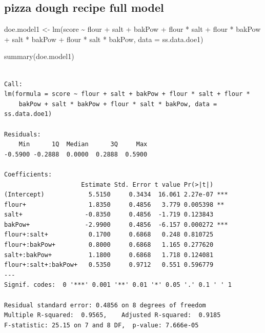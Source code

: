\documentclass[
  a4paper,
]{scrbook}
\newenvironment{Shaded}{\begin{snugshade}}{\end{snugshade}}
\newcommand{\AttributeTok}[1]{\textcolor[rgb]{0.40,0.45,0.13}{#1}}
\newcommand{\FunctionTok}[1]{\textcolor[rgb]{0.28,0.35,0.67}{#1}}
\newcommand{\NormalTok}[1]{\textcolor[rgb]{0.00,0.23,0.31}{#1}}
\newcommand{\OtherTok}[1]{\textcolor[rgb]{0.00,0.23,0.31}{#1}}
\newcommand{\SpecialCharTok}[1]{\textcolor[rgb]{0.37,0.37,0.37}{#1}}
\begin{document}
\subsection{pizza dough recipe full
model}\label{pizza-dough-recipe-full-model}

\begin{Shaded}
\begin{Highlighting}[]
\NormalTok{doe.model1 }\OtherTok{\textless{}{-}} \FunctionTok{lm}\NormalTok{(score }\SpecialCharTok{\textasciitilde{}}\NormalTok{ flour }\SpecialCharTok{+}\NormalTok{ salt }\SpecialCharTok{+}\NormalTok{ bakPow }\SpecialCharTok{+}
\NormalTok{flour }\SpecialCharTok{*}\NormalTok{ salt }\SpecialCharTok{+}\NormalTok{ flour }\SpecialCharTok{*}\NormalTok{ bakPow }\SpecialCharTok{+}
\NormalTok{salt }\SpecialCharTok{*}\NormalTok{ bakPow }\SpecialCharTok{+}\NormalTok{ flour }\SpecialCharTok{*}\NormalTok{ salt }\SpecialCharTok{*}\NormalTok{ bakPow,}
\AttributeTok{data =}\NormalTok{ ss.data.doe1)}

\FunctionTok{summary}\NormalTok{(doe.model1)}
\end{Highlighting}
\end{Shaded}

\begin{verbatim}

Call:
lm(formula = score ~ flour + salt + bakPow + flour * salt + flour * 
    bakPow + salt * bakPow + flour * salt * bakPow, data = ss.data.doe1)

Residuals:
    Min      1Q  Median      3Q     Max 
-0.5900 -0.2888  0.0000  0.2888  0.5900 

Coefficients:
                     Estimate Std. Error t value Pr(>|t|)    
(Intercept)            5.5150     0.3434  16.061 2.27e-07 ***
flour+                 1.8350     0.4856   3.779 0.005398 ** 
salt+                 -0.8350     0.4856  -1.719 0.123843    
bakPow+               -2.9900     0.4856  -6.157 0.000272 ***
flour+:salt+           0.1700     0.6868   0.248 0.810725    
flour+:bakPow+         0.8000     0.6868   1.165 0.277620    
salt+:bakPow+          1.1800     0.6868   1.718 0.124081    
flour+:salt+:bakPow+   0.5350     0.9712   0.551 0.596779    
---
Signif. codes:  0 '***' 0.001 '**' 0.01 '*' 0.05 '.' 0.1 ' ' 1

Residual standard error: 0.4856 on 8 degrees of freedom
Multiple R-squared:  0.9565,    Adjusted R-squared:  0.9185 
F-statistic: 25.15 on 7 and 8 DF,  p-value: 7.666e-05
\end{verbatim}
\end{document}
